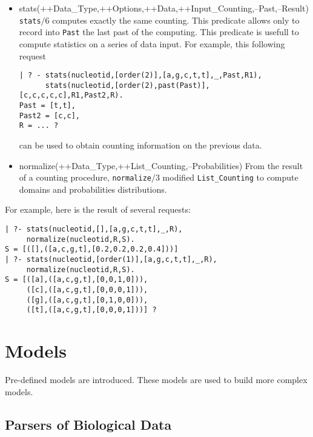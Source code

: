 \documentclass{book}
\begin{document}
\begin{itemize}
\begin{verbatim}
     ([c,a],[(a,0),(c,0),(g,0),(t,0)]),
     ([c,c],[(a,0),(c,3),(g,0),(t,1)]),
     ([c,g],[(a,0),(c,1),(g,0),(t,0)]),
     ([c,t],[(a,0),(c,0),(g,0),(t,1)]),
     ([g,a],[(a,0),(c,0),(g,0),(t,0)]),
     ([g,c],[(a,0),(c,0),(g,0),(t,1)]),
     ([g,g],[(a,0),(c,1),(g,0),(t,0)]),
     ([g,t],[(a,0),(c,0),(g,0),(t,1)]),
     ([t,a],[(a,0),(c,0),(g,0),(t,0)]),
     ([t,c],[(a,0),(c,0),(g,0),(t,1)]),
     ([t,g],[(a,0),(c,0),(g,0),(t,0)]),
     ([t,t],[(a,0),(c,1),(g,0),(t,0)]),
     ]?
\end{verbatim}
\item stats(++Data\_Type,++Options,++Data,++Input\_Counting,--Past,--Result)
\texttt{stats$\slash 6$} computes exactly the same counting. This predicate allows only to record
into \texttt{Past} the last past of the computing. This predicate is usefull to compute 
statistics on a series of data input. For example, this following request
\begin{verbatim}
| ? - stats(nucleotid,[order(2)],[a,g,c,t,t],_,Past,R1),
      stats(nucleotid,[order(2),past(Past)],[c,c,c,c,c],R1,Past2,R).
Past = [t,t],
Past2 = [c,c],
R = ... ?
\end{verbatim}     
can be used to obtain counting information on the previous data.
\item normalize(++Data\_Type,++List\_Counting,--Probabilities)
From the result of a counting procedure, \texttt{normalize$\slash 3$} modified \texttt{List\_Counting}
to compute domains and probabilities distributions. 
\end{itemize} 
For example, here is the result of several requests:
\begin{verbatim}
| ?- stats(nucleotid,[],[a,g,c,t,t],_,R),
     normalize(nucleotid,R,S).
S = [([],([a,c,g,t],[0.2,0.2,0.2,0.4]))]
| ?- stats(nucleotid,[order(1)],[a,g,c,t,t],_,R),
     normalize(nucleotid,R,S).
S = [([a],([a,c,g,t],[0,0,1,0])),
     ([c],([a,c,g,t],[0,0,0,1])),
     ([g],([a,c,g,t],[0,1,0,0])),
     ([t],([a,c,g,t],[0,0,0,1]))] ?
\end{verbatim}



\chapter{Models}

Pre-defined models are introduced.  These models are used to build more complex models.

\section{Parsers of Biological Data}
\end{document}
